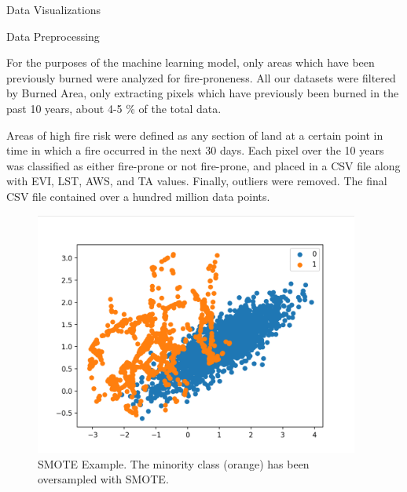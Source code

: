 \documentclass[final]{beamer}
\newlength{\colwidth}
\begin{document}
\begin{frame}[t]
\begin{columns}[t]
\begin{column}{\colwidth}
\begin{block}{Data Visualizations}
  \end{block}

  \begin{block}{Data Preprocessing}

    For the purposes of the machine learning model, only areas which have been previously burned were analyzed for fire-proneness. All our datasets were filtered by Burned Area, only extracting pixels which have previously been burned in the past 10 years, about 4-5 \% of the total data.
    
    Areas of high fire risk were defined as any section of land at a certain point in time in which a fire occurred in the next 30 days. Each pixel over the 10 years was classified as either fire-prone or not fire-prone, and placed in a CSV file along with EVI, LST, AWS, and TA values. Finally, outliers were removed. The final CSV file contained over a hundred million data points.
    \vspace{1cm}
    \begin{figure}
        \centering
        \begin{minipage}{0.5\textwidth}
            \centering
            \includegraphics[width=0.95\textwidth]{images/SMOTE.png}
            \caption{SMOTE Example. The minority class (orange) has been oversampled with SMOTE.}
            \label{fig:CAEVI.png}
        \end{minipage}%
        \begin{minipage}{0.5\textwidth}
            \centering

\end{minipage}
\end{figure}
\end{block}
\end{column}
\end{columns}
\end{frame}
\end{document}
